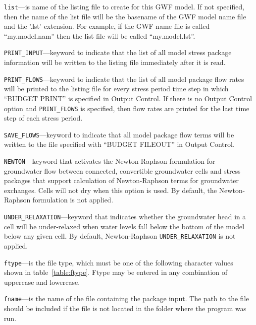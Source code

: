 
\item \texttt{list}---is name of the listing file to create for this GWF model.  If not specified, then the name of the list file will be the basename of the GWF model name file and the '.lst' extension.  For example, if the GWF name file is called ``my.model.nam'' then the list file will be called ``my.model.lst''.

\item \texttt{PRINT\_INPUT}---keyword to indicate that the list of all model stress package information will be written to the listing file immediately after it is read.

\item \texttt{PRINT\_FLOWS}---keyword to indicate that the list of all model package flow rates will be printed to the listing file for every stress period time step in which ``BUDGET PRINT'' is specified in Output Control.  If there is no Output Control option and \texttt{PRINT\_FLOWS} is specified, then flow rates are printed for the last time step of each stress period.

\item \texttt{SAVE\_FLOWS}---keyword to indicate that all model package flow terms will be written to the file specified with ``BUDGET FILEOUT'' in Output Control.

\item \texttt{NEWTON}---keyword that activates the Newton-Raphson formulation for groundwater flow between connected, convertible groundwater cells and stress packages that support calculation of Newton-Raphson terms for groundwater exchanges. Cells will not dry when this option is used. By default, the Newton-Raphson formulation is not applied.

\item \texttt{UNDER\_RELAXATION}---keyword that indicates whether the groundwater head in a cell will be under-relaxed when water levels fall below the bottom of the model below any given cell. By default, Newton-Raphson \texttt{UNDER\_RELAXATION} is not applied.

\item \texttt{ftype}---is the file type, which must be one of the following character values shown in table~\ref{table:ftype}. Ftype may be entered in any combination of uppercase and lowercase.

\item \texttt{fname}---is the name of the file containing the package input.  The path to the file should be included if the file is not located in the folder where the program was run.

